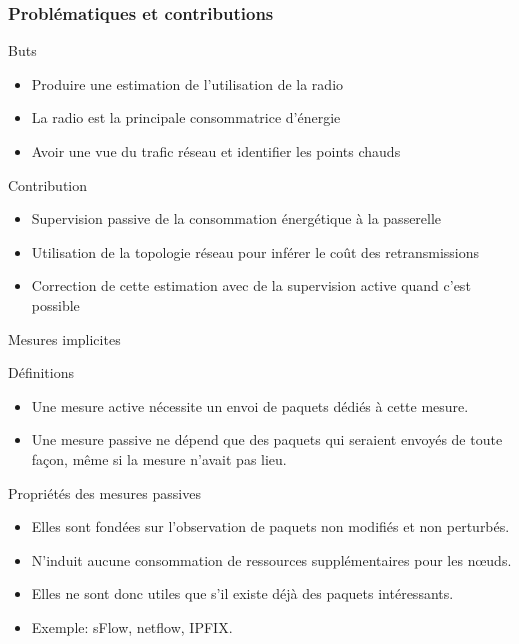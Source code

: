\begin{frame}\frametitle{Problématiques et contributions}

  \begin{block}{Buts}
    \begin{itemize}
      \item Produire une estimation de l'utilisation de la radio
      \item La radio est la principale consommatrice d'énergie
      \item Avoir une vue du trafic réseau et identifier les points chauds
    \end{itemize}
  \end{block}

  \begin{alertblock}{Contribution}
    \begin{itemize}
      \item Supervision passive de la consommation énergétique à la passerelle
      \item Utilisation de la topologie réseau pour inférer le coût des retransmissions
      \item Correction de cette estimation avec de la supervision active quand c'est possible
    \end{itemize}
  \end{alertblock}

\end{frame}

\begin{frame}{Mesures implicites}
  \begin{block}{Définitions}
    \begin{itemize}
      \item Une mesure active nécessite un envoi de paquets dédiés à cette mesure.
      \item Une mesure passive ne dépend que des paquets qui seraient envoyés de toute façon, même si la mesure n'avait pas lieu.
    \end{itemize}
  \end{block}
  \begin{block}{Propriétés des mesures passives}
    \begin{itemize}
      \item Elles sont fondées sur l'observation de paquets non modifiés et non perturbés.
      \item N'induit aucune consommation de ressources supplémentaires pour les nœuds.
      \item Elles ne sont donc utiles que s'il existe déjà des paquets intéressants.
      \item Exemple: sFlow, netflow, IPFIX.
    \end{itemize}

  \end{block}

\end{frame}

